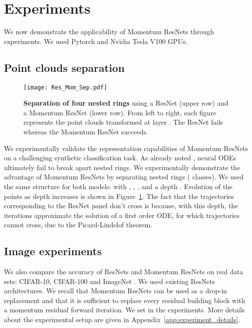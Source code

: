 \documentclass{article}
\begin{document}
\section{Experiments}

We now demonstrate the applicability of Momentum ResNets through experiments. We used Pytorch and Nvidia Tesla V100 GPUs. 
\subsection{Point clouds separation}\label{sec:point_clouds}
\begin{figure}[H]
\texttt{[image: Res\_Mom\_Sep.pdf]} 
\caption{\textbf{Separation of four nested rings} using a ResNet (upper row) and a Momentum ResNet (lower row). From left to right, each figure represents the point clouds transformed at layer . The ResNet fails whereas the Momentum ResNet succeeds.}\label{fig:four_imbricated}
\vspace{-1em}
\end{figure}
We experimentally validate the representation capabilities of Momentum ResNets on a challenging synthetic classification task. 
As already noted \citep{dupont2019augmented}, neural ODEs ultimately fail to break apart nested rings.
We experimentally demonstrate the advantage of Momentum ResNets by separating  nested rings ( classes). We used the same structure for both models:  with , , , and a depth . Evolution of the points as depth increases is shown in Figure~\ref{fig:four_imbricated}.  The fact that the trajectories corresponding to the ResNet panel don't cross is because, with this depth, the iterations approximate the solution of a first order ODE, for which trajectories cannot cross, due to the Picard-Lindelof theorem.

\subsection{Image experiments}\label{sec:experiments_images}


We also compare the accuracy of ResNets and Momentum ResNets on real data sets: CIFAR-10, CIFAR-100 \citep{CIFAR} and  ImageNet \citep{deng2009imagenet}.  We used existing ResNets architectures. We recall that Momentum ResNets can be used as a drop-in replacement and that it is sufficient to replace every residual building block with a momentum residual forward iteration. We set  in the experiments. More details about the experimental setup are given in Appendix~\ref{app:experiment_details}.
\end{document}
